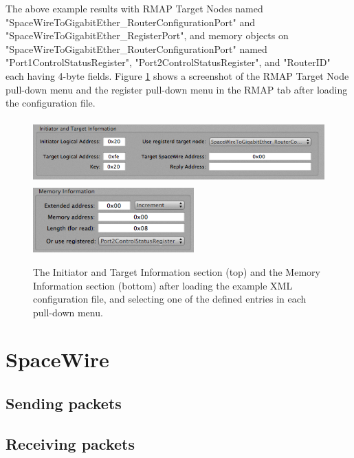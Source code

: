 \documentclass[a4paper,10pt]{article}
\begin{document}
The above example results with RMAP Target Nodes named "SpaceWireToGigabitEther\_RouterConfigurationPort" and "SpaceWireToGigabitEther\_RegisterPort", and memory objects on "SpaceWireToGigabitEther\_RouterConfigurationPort" named "Port1ControlStatusRegister", "Port2ControlStatusRegister", and "RouterID" each having 4-byte fields. Figure \ref{figure:section_pull-down_menus} shows a screenshot of the RMAP Target Node pull-down menu and the register pull-down menu in the RMAP tab after loading the configuration file.
\begin{figure}[htb]
\begin{center}
\includegraphics[height=2.5cm]{figures/SpaceWireRMAPGUI/Section_InitiatorAndTargetInformation_with_registered_RMAPTargetNode.png}\\\vspace{2mm}
\includegraphics[height=2.5cm]{figures/SpaceWireRMAPGUI/Section_MemoryInformation_with_registered_MemoryObject.png}
\caption{The Initiator and Target Information section (top) and the Memory Information section (bottom) after loading the example XML configuration file, and selecting one of the defined entries in each pull-down menu.}
\label{figure:section_pull-down_menus}
\end{center}
\end{figure}

\section{SpaceWire}
\subsection{Sending packets}
\subsection{Receiving packets}
\end{document}
